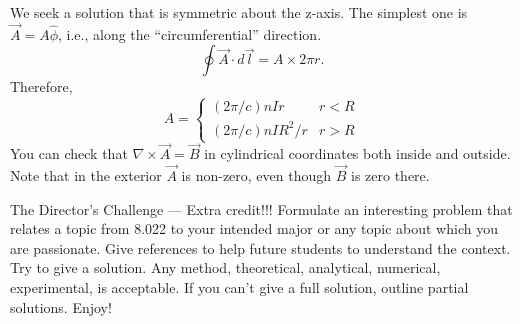 \documentclass[makesolutionspdf]{esg8022pset}
\begin{document}
\begin{solution}
  We seek a solution that is symmetric about the z-axis.  The simplest one is
  $\vec{A}=A\hat\phi$, i.e., along the ``circumferential'' direction.
  \[ \oint \vec{A}\cdot d\vec{l} = A\times 2\pi r.\]
  Therefore, 
  \begin{equation}
    A = \begin{cases} (2\pi/c)nIr & r<R\\ (2\pi/c)nIR^2/r & r>R \end{cases}
  \end{equation}
  You can check  that $\nabla\times \vec{A}=\vec{B}$ in cylindrical coordinates
  both inside and outside.  Note that in the exterior $\vec{A}$ is non-zero,
  even though $\vec{B}$ is zero there.
\end{solution}





\begin{problem}{The Director's Challenge --- Extra credit!!!}
  Formulate an interesting problem that relates a topic from 8.022 to your
  intended major or any topic about which you are passionate.  Give references
  to help future students to understand the context.  Try to give a solution.
  Any method, theoretical, analytical, numerical, experimental, is acceptable.
  If you can't give a full solution, outline partial solutions. Enjoy!
\end{problem}
\end{document}
